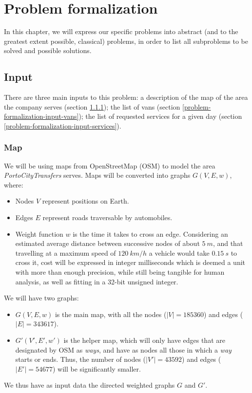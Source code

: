 \chapter{Problem formalization} \label{problem-formalization}
In this chapter, we will express our specific problems into abstract (and to the greatest extent possible, classical) problems, in order to list all subproblems to be solved and possible solutions.
\section{Input} \label{problem-formalization-input}
There are three main inputs to this problem: a description of the map of the area the company serves (section \ref{problem-formalization-input-map}); the list of vans (section \ref{problem-formalization-input-vans}); the list of requested services for a given day (section \ref{problem-formalization-input-services}).
\subsection{Map} \label{problem-formalization-input-map}
We will be using maps from OpenStreetMap (OSM) to model the area \emph{PortoCityTransfers} serves.
Maps will be converted into graphs $G(V,E, w)$, where:
\begin{itemize}
    \item Nodes $V$ represent positions on Earth.
    \item Edges $E$ represent roads traversable by automobiles.
    \item Weight function $w$ is the time it takes to cross an edge. Considering an estimated average distance between successive nodes of about $\SI{5}{m}$, and that travelling at a maximum speed of $\SI{120}{km/h}$ a vehicle would take $\SI{0.15}{s}$ to cross it, cost will be expressed in integer milliseconds which is deemed a unit with more than enough precision, while still being tangible for human analysis, as well as fitting in a 32-bit unsigned integer.
\end{itemize}
We will have two graphs:
\begin{itemize}
    \item $G(V,E,w)$ is the main map, with all the nodes ($|V|=185360$) and edges ($|E|=343617$).
    \item $G'(V',E',w')$ is the helper map, which will only have edges that are designated by OSM as \emph{ways}, and have as nodes all those in which a \emph{way} starts or ends. Thus, the number of nodes ($|V'|=43592$) and edges ($|E'|=54677$) will be significantly smaller.
\end{itemize}
We thus have as input data the directed weighted graphs $G$ and $G'$.
